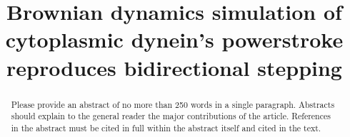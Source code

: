 \documentclass[9pt,twocolumn,twoside]{article}
\title{Brownian dynamics simulation of cytoplasmic dynein's powerstroke reproduces bidirectional stepping}
\begin{document}
\maketitle

\begin{abstract}
  Please provide an abstract of no more than 250 words in a single paragraph. Abstracts should explain to the general reader the major contributions of the article. References in the abstract must be cited in full within the abstract itself and cited in the text.
\end{abstract}
  



\end{document}
